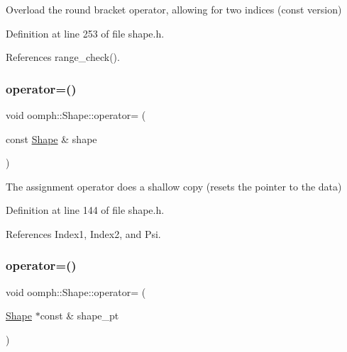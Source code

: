 Overload the round bracket operator, allowing for two indices (const version) 



Definition at line 253 of file shape.\+h.



References range\+\_\+check().

\mbox{\label{classoomph_1_1Shape_aa9d3d4203abf1e39fc3db2732355c801}} 
\subsubsection{\texorpdfstring{operator=()}{operator=()}\hspace{0.1cm}{\footnotesize\ttfamily [1/2]}}
{\footnotesize\ttfamily void oomph\+::\+Shape\+::operator= (\begin{DoxyParamCaption}\item[{const \hyperlink{classoomph_1_1Shape}{Shape} \&}]{shape }\end{DoxyParamCaption})\hspace{0.3cm}{\ttfamily [inline]}}

The assignment operator does a shallow copy (resets the pointer to the data) 

Definition at line 144 of file shape.\+h.



References Index1, Index2, and Psi.

\mbox{\label{classoomph_1_1Shape_ae56db76f6d0b46acb57869896dc9be20}} 
\subsubsection{\texorpdfstring{operator=()}{operator=()}\hspace{0.1cm}{\footnotesize\ttfamily [2/2]}}
{\footnotesize\ttfamily void oomph\+::\+Shape\+::operator= (\begin{DoxyParamCaption}\item[{\hyperlink{classoomph_1_1Shape}{Shape} $\ast$const \&}]{shape\+\_\+pt }\end{DoxyParamCaption})\hspace{0.3cm}{\ttfamily [inline]}}

